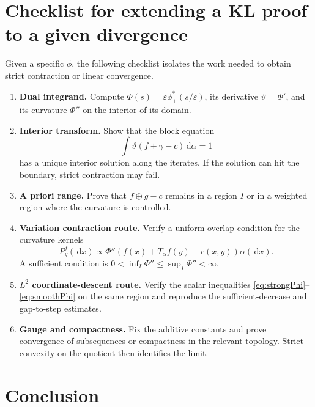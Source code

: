 \documentclass[11pt]{article}
\newcommand{\eps}{\varepsilon}
\newcommand{\dd}{\,\mathrm{d}}
\begin{document}
\section{Checklist for extending a KL proof to a given divergence}

Given a specific $\phi$, the following checklist isolates the work needed to
obtain strict contraction or linear convergence.

\begin{enumerate}[label=\textbf{Step \arabic*.},leftmargin=2.8cm]
  \item \textbf{Dual integrand.} Compute
  $\Phi(s)=\eps\phi_+^*(s/\eps)$, its derivative $\vartheta=\Phi'$, and its
  curvature $\Phi''$ on the interior of its domain.

  \item \textbf{Interior transform.} Show that the block equation
  \begin{equation*}
    \int \vartheta(f+\gamma-c)\dd\alpha=1
  \end{equation*}
  has a unique interior solution along the iterates.  If the solution can hit
  the boundary, strict contraction may fail.

  \item \textbf{A priori range.} Prove that $f\oplus g-c$ remains in a region
  $I$ or in a weighted region where the curvature is controlled.

  \item \textbf{Variation contraction route.} Verify a uniform overlap
  condition for the curvature kernels
  \begin{equation*}
    P_y^f(\dd x)\propto \Phi''(f(x)+T_\alpha f(y)-c(x,y))\alpha(\dd x).
  \end{equation*}
  A sufficient condition is $0<\inf_I\Phi''\leq \sup_I\Phi''<\infty$.

  \item \textbf{$L^2$ coordinate-descent route.} Verify the scalar inequalities
  \eqref{eq:strongPhi}--\eqref{eq:smoothPhi} on the same region and reproduce
  the sufficient-decrease and gap-to-step estimates.

  \item \textbf{Gauge and compactness.} Fix the additive constants and prove
  convergence of subsequences or compactness in the relevant topology.  Strict
  convexity on the quotient then identifies the limit.
\end{enumerate}

\section{Conclusion}
\end{document}
